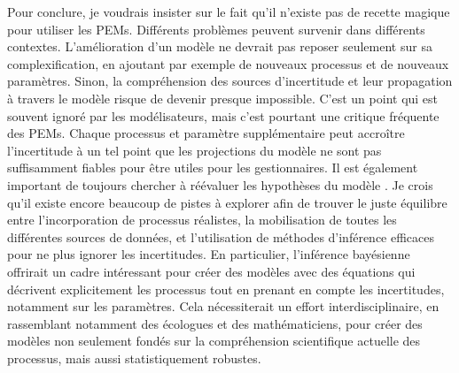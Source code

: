 Pour conclure, je voudrais insister sur le fait qu'il n’existe pas de recette magique pour utiliser les PEMs. Différents problèmes peuvent survenir dans différents contextes. L'amélioration d'un modèle ne devrait pas reposer seulement sur sa complexification, en ajoutant par exemple de nouveaux processus et de nouveaux paramètres. Sinon, la compréhension des sources d’incertitude et leur propagation à travers le modèle risque de devenir presque impossible. 
C'est un point qui est souvent ignoré par les modélisateurs, mais c'est pourtant une critique fréquente des PEMs. Chaque processus et paramètre supplémentaire peut accroître l’incertitude à un tel point que les projections du modèle ne sont pas suffisamment fiables pour être utiles pour les gestionnaires. Il est également important de toujours chercher à réévaluer les hypothèses du modèle \citep{Harrison2021}. Je crois qu'il existe encore beaucoup de pistes à explorer afin de trouver le juste équilibre entre l'incorporation de processus réalistes, la mobilisation de toutes les différentes sources de données, et l'utilisation de méthodes d'inférence efficaces pour ne plus ignorer les incertitudes. En particulier, l'inférence bayésienne offrirait un cadre intéressant pour créer des modèles avec des équations qui décrivent explicitement les processus tout en prenant en compte les incertitudes, notamment sur les paramètres. Cela nécessiterait un effort interdisciplinaire, en rassemblant notamment des écologues et des mathématiciens, pour créer des modèles non seulement fondés sur la compréhension scientifique actuelle des processus, mais aussi statistiquement robustes.